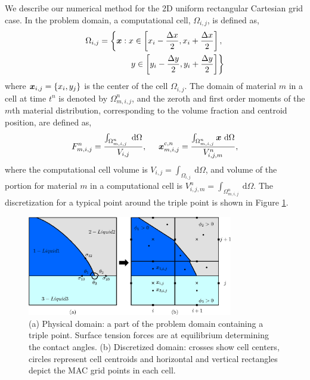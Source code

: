 \documentclass[]{article}
\newcommand{\bmx}{\mbox{\boldmath $x$\unboldmath}}
\begin{document}
We describe our numerical method for the 
2D uniform rectangular Cartesian grid
case.  
In the problem domain, a computational cell, $\Omega_{i,j}$, is defined as,
\begin{eqnarray}
  \label{eq:cell_def}
  \Omega_{i,j} = 
   \left\{ \bmx: x \in \left[x_i-\frac{\Delta x}{2}, x_i+\frac{\Delta x}{2}\right],\right.\\
   \left. y \in \left[ y_i-\frac{\Delta y}{2}, y_i+\frac{\Delta y}{2}\right] \right\}
\end{eqnarray}
where $\bmx_{i,j} = \left\{x_i,y_j\right\}$ is the 
center of the cell $\Omega_{i,j}$. The domain of 
material $m$ in a cell at time $t^n$ is denoted by $\Omega_{m,i,j}^n$, 
and the zeroth and first order moments of the $m$th material 
distribution, corresponding to the volume fraction and 
centroid position, are defined as,
\begin{equation}
  \label{eq:moments_def}
  F_{m,i,j}^n = \frac{\int_{\Omega_{m,i,j}^n} ~\mathrm{d} \Omega}{V_{i,j}}, \hspace{0.5cm}\bmx_{m,i,j}^{c,n} = \frac{\int_{\Omega_{m,i,j}^n} \bmx ~\mathrm{d} \Omega}{V_{i,j,m}^n},
\end{equation}
where the computational cell volume is $V_{i,j} = \int_{\Omega_{i,j}} ~\mathrm{d} \Omega$, and volume of the portion for material $m$ in a computational cell is $V_{i,j,m}^n= \int_{\Omega_{m,i,j}^n} ~\mathrm{d} \Omega$. The discretization for a typical point around the triple point is shown in Figure \ref{fig:triple_point}.
\begin{figure}[htbp]
  \centering
  \includegraphics[width=0.8\textwidth]{triple_point_drop_impact.eps}
  \caption{(a) Physical domain: a part of the problem domain containing a triple point. Surface tension forces are at equilibrium determining the contact angles. (b) Discretized domain: crosses show cell centers, circles represent cell centroids and horizontal and vertical rectangles depict the MAC grid points in each cell.}
  \label{fig:triple_point}
\end{figure}
\end{document}
